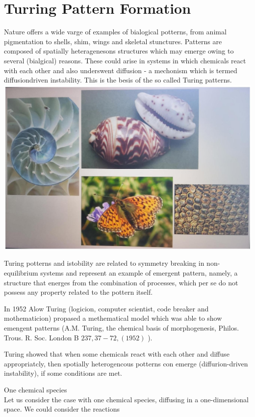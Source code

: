 \documentclass[10pt]{article}
\begin{document}
\section*{Turring Pattern Formation}
Nature offers a wide varge of examples of bialogical potterns, from animal pigmentation to shells, shim, wings and skeletal stunctures. Patterns are composed of spatially heteragenesons structures which may emerge owing to several (bialgical) reasons. These could arise in systems in which chemicals react with each other and also underswent diffusion - a mechonism which is termed diffusiondriven instability. This is the besis of the so called Turing patterns.\\
\includegraphics[max width=\textwidth, center]{2025_10_17_3cf351a4349ae3691080g-01}

Turing potterns and istobility are related to symmetry breaking in non-equilibrium systems and represent an example of emergent pattern, namely, a structure that energes from the combination of processes, which per se do not possess any property related to the pottern itself.

In 1952 Alow Turing (logicion, computer scientist, code breaker and mothematicion) propased a methematical model which was able to show emengent patterns (A.M. Turing, the chemical basis of morphogenesis, Philos. Trous. R. Soc. London B $237,37-72,(1952)$ ).

Turing showed that when some chemicals react with each other and diffuse appropriatcly, then spotially heterogencous potterns con emerge (diffurion-driven instability), if some conditions are met.

One chemical species\\
Let us consider the case with one chemical species, diffusing in a one-dimensional space. We could consider the reactions
\end{document}
